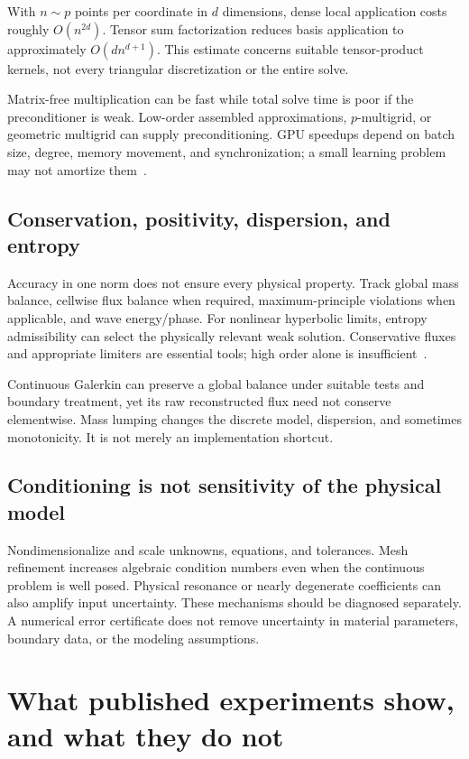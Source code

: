 \documentclass[11pt,a4paper]{article}
\begin{document}
With $n\sim p$ points per coordinate in $d$ dimensions, dense local application costs roughly $O(n^{2d})$. Tensor sum factorization reduces basis application to approximately $O(dn^{d+1})$. This estimate concerns suitable tensor-product kernels, not every triangular discretization or the entire solve.

Matrix-free multiplication can be fast while total solve time is poor if the preconditioner is weak. Low-order assembled approximations, $p$-multigrid, or geometric multigrid can supply preconditioning. GPU speedups depend on batch size, degree, memory movement, and synchronization; a small learning problem may not amortize them~\cite{ceed}.

\subsection{Conservation, positivity, dispersion, and entropy}
Accuracy in one norm does not ensure every physical property. Track global mass balance, cellwise flux balance when required, maximum-principle violations when applicable, and wave energy/phase. For nonlinear hyperbolic limits, entropy admissibility can select the physically relevant weak solution. Conservative fluxes and appropriate limiters are essential tools; high order alone is insufficient~\cite{leveque}.

Continuous Galerkin can preserve a global balance under suitable tests and boundary treatment, yet its raw reconstructed flux need not conserve elementwise. Mass lumping changes the discrete model, dispersion, and sometimes monotonicity. It is not merely an implementation shortcut.

\subsection{Conditioning is not sensitivity of the physical model}
Nondimensionalize and scale unknowns, equations, and tolerances. Mesh refinement increases algebraic condition numbers even when the continuous problem is well posed. Physical resonance or nearly degenerate coefficients can also amplify input uncertainty. These mechanisms should be diagnosed separately. A numerical error certificate does not remove uncertainty in material parameters, boundary data, or the modeling assumptions.

\section{What published experiments show, and what they do not}\label{sec:empirical}
\end{document}
